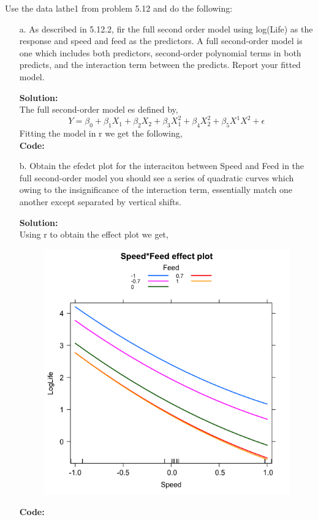 \documentclass[12pt]{article}
\makeatletter
\theoremstyle{homework}
\newenvironment{exercise}[1]
{\def\@currentlabel{#1}\exercisecore}
{\endexercisecore}
\newcommand{\localhead}[1]{\par\smallskip\noindent\textbf{#1}\nobreak\\}%
\newcommand\solution{\localhead{Solution:}}
\makeatother
\begin{document}
\begin{exercise}{1} Use the data lathe1 from problem 5.12 and do the following: 
  \begin{enumerate}
    \item[a.] As described in 5.12.2, fir the full second order model using log(Life) as the response and 
    speed and feed as the predictors. A full second-order model is one which includes both predictors, 
    second-order polynomial terms in both predicts, and the interaction term between the predicts. Report
    your fitted model. \\
    \solution The full second-order model es defined by, 
      \begin{equation*}
        Y = \beta_0 + \beta_1X_1 + \beta_2X_2 + \beta_3X^2_1 + \beta_4X^2_2 + \beta_5X^1X^2 + \epsilon
      \end{equation*}
      Fitting the model in r we get the following, \\
       \textbf{Code:}
       \begin{center}
       
       \end{center} 
       \newpage


       \item[b.] Obtain the efedct plot for the interaciton between Speed and Feed in the full second-order model 
       you should see a series of quadratic curves which owing to the insignificance of the interaction term, essentially 
       match one another except separated by vertical shifts. \\
       \solution Using r to obtain the effect plot we get, 
        \begin{figure}[H]
          \begin{center}
          \includegraphics[width = .66\textwidth]{Rplot.png}
          \end{center}
        \end{figure}
        \textbf{Code:}
        \begin{center}
        
        \end{center} 
        \newpage
        \newpage


\end{enumerate}
\end{exercise}
\end{document}
